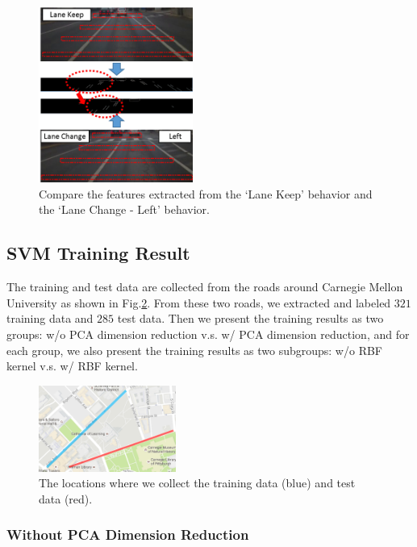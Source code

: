 \documentclass[10pt,twocolumn,letterpaper]{article}
\begin{document}
\begin{figure}[t]
	\centering
	\includegraphics[width=0.45\textwidth]{./img/feature.png}
	\caption{Compare the features extracted from the `Lane Keep' behavior and the `Lane Change - Left' behavior.}
	\label{fig:feature}
\end{figure}

\subsection{SVM Training Result}

The training and test data are collected from the roads around Carnegie Mellon University as shown in Fig.\ref{fig:datamap}.  From these two roads, we extracted and labeled $321$ training data and $285$ test data. Then we present the training results as two groups: w/o PCA dimension reduction v.s. w/ PCA dimension reduction, and for each group, we also present the training results as two subgroups: w/o RBF kernel v.s. w/ RBF kernel.

\begin{figure}[t]
	\centering
	\includegraphics[width=0.4\textwidth]{./img/datamap.png}
	\caption{The locations where we collect the training data (blue) and test data (red).}
	\label{fig:datamap}
\end{figure}

\subsubsection{Without PCA Dimension Reduction}
\end{document}
